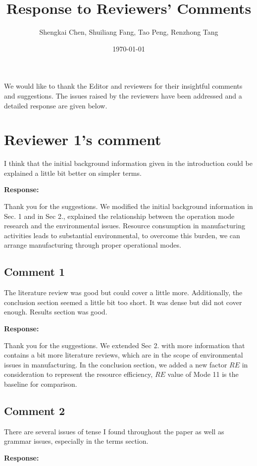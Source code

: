 \documentclass{article}
\author{Shengkai Chen, Shuiliang Fang, Tao Peng, Renzhong Tang}
\date{\today}
\title{Response to Reviewers' Comments}
\begin{document}
\maketitle

We would like to thank the Editor and reviewers for their insightful comments and suggestions. The issues raised by the reviewers have been addressed and a detailed response are given below.

\setlength\parindent{0pt}

\section*{Reviewer 1's comment}
I think that the initial background information given in the introduction could be explained a little bit better on simpler terms.

\textbf{Response:}

Thank you for the suggestions. We modified the initial background information in Sec. 1 and in Sec 2., explained the relationship between the operation mode research and the environmental issues. Resource consumption in manufacturing activities leads to substantial environmental, to overcome this burden, we can arrange manufacturing through proper operational modes.

\subsection*{Comment 1} %
The literature review was good but could cover a little more. Additionally, the conclusion section seemed a little bit too short. It was dense but did not cover enough. Results section was good.

\textbf{Response:}
 
Thank you for the suggestions. We extended Sec 2. with more information that contains a bit more literature reviews, which are in the scope of environmental issues in manufacturing. In the conclusion section, we added a new factor $RE$ in consideration to represent the resource efficiency, $RE$ value of Mode 11 is the baseline for comparison.

\subsection*{Comment 2} %
There are several issues of tense I found throughout the paper as well as grammar issues, especially in the terms section.

\textbf{Response:}
\end{document}
